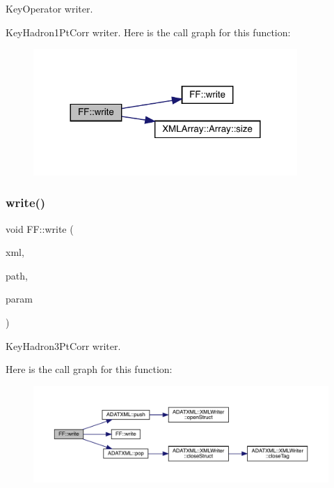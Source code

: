 Key\+Operator writer. 

Key\+Hadron1\+Pt\+Corr writer. Here is the call graph for this function\+:\nopagebreak
\begin{figure}[H]
\begin{center}
\leavevmode
\includegraphics[width=284pt]{d5/da6/namespaceFF_a5c3e38934ee51ae23bc9d39dca34acc1_cgraph}
\end{center}
\end{figure}
\mbox{\label{namespaceFF_a9e6eed897710dbad982d5a699a70f857}} 
\subsubsection{\texorpdfstring{write()}{write()}\hspace{0.1cm}{\footnotesize\ttfamily [10/13]}}
{\footnotesize\ttfamily void F\+F\+::write (\begin{DoxyParamCaption}\item[{X\+M\+L\+Writer \&}]{xml,  }\item[{const std\+::string \&}]{path,  }\item[{const \mbox{\hyperlink{structFF_1_1KeyHadron3PtCorr__t}{Key\+Hadron3\+Pt\+Corr\+\_\+t}} \&}]{param }\end{DoxyParamCaption})}



Key\+Hadron3\+Pt\+Corr writer. 

Here is the call graph for this function\+:\nopagebreak
\begin{figure}[H]
\begin{center}
\leavevmode
\includegraphics[width=350pt]{d5/da6/namespaceFF_a9e6eed897710dbad982d5a699a70f857_cgraph}
\end{center}
\end{figure}
\mbox{\label{namespaceFF_a1b83f6ebd714e1d672d8c425605ff1de}} 
